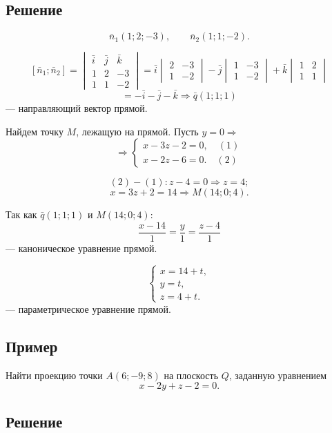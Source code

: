 \documentclass[12pt,a4paper]{article}
\newcommand{\vn}{\bar n}
\newcommand{\vq}{\bar q}
\newcommand{\vi}{\bar i}
\newcommand{\vj}{\bar j}
\newcommand{\vk}{\bar k}
\begin{document}
\subsection*{\textbf{Решение}}

$$
\vn_1(1;2;-3),\qquad \vn_2(1;1;-2).
$$

$$
[\vn_1;\vn_2]=
\begin{vmatrix}
\vi & \vj & \vk\\
1 & 2 & -3\\
1 & 1 & -2
\end{vmatrix}
=
\vi
\begin{vmatrix}2&-3\\1&-2
\end{vmatrix}
-\vj
\begin{vmatrix}1&-3\\1&-2
\end{vmatrix}
+\vk
\begin{vmatrix}1&2\\1&1
\end{vmatrix}
$$
$$
=-\vi-\vj-\vk\Rightarrow \vq(1;1;1)
$$
--- направляющий вектор прямой.

Найдем точку $M$, лежащую на прямой. Пусть $y=0\Rightarrow$
$$
\Rightarrow
\begin{cases}
x-3z-2=0,\quad (1)\\
x-2z-6=0.\quad (2)
\end{cases}
$$

$$(2)-(1): z-4=0\Rightarrow z=4;$$
$$
x=3z+2=14\Rightarrow M(14;0;4).
$$

Так как $\vq(1;1;1)$ и $M(14;0;4)$:
$$
\frac{x-14}{1}=\frac{y}{1}=\frac{z-4}{1}
$$
--- каноническое уравнение прямой.

$$
\begin{cases}
x=14+t,\\
y=t,\\
z=4+t.
\end{cases}
$$
--- параметрическое уравнение прямой.

\subsection*{\textbf{Пример}}

Найти проекцию точки $A(6;-9;8)$ на плоскость $Q$, заданную уравнением
$$
x-2y+z-2=0.
$$

\subsection*{\textbf{Решение}}
\end{document}

